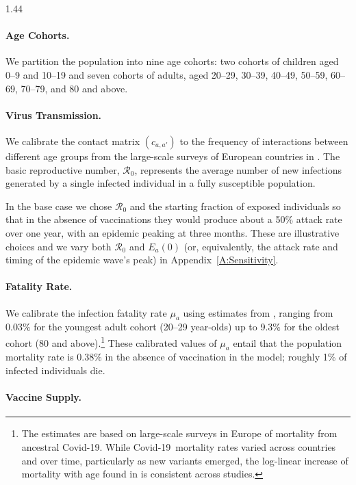 \documentclass[12pt]{article}
\newcommand{\covid}{Covid-19}
\newcommand{\Rzero}{\mathcal{R}_0}
\begin{document}
\begin{spacing}{1.44}
\paragraph{Age Cohorts.}

We partition the population into nine age cohorts: two cohorts of
children aged 0--9 and 10--19 and seven cohorts of adults, aged 20--29, 30--39,
40--49, 50--59, 60--69, 70--79, and 80 and above.

\paragraph{Virus Transmission.}

We calibrate the contact matrix $(c_{a,a'})$ to the frequency of
interactions between different age groups from the large-scale surveys
of European countries in \citet{Mossong2008}.
The basic reproductive number, $\Rzero$, represents the average number
of new infections generated by a single infected individual in a fully
susceptible population.

In the base case we chose $\Rzero$ and the starting fraction of exposed
individuals so that in the absence of vaccinations they would produce
about a 50\% attack rate over one year, with an epidemic peaking at
three months. These are illustrative choices and we vary both
$\Rzero$ and $E_a(0)$ (or, equivalently, the attack rate and timing of
the epidemic wave's peak) in Appendix~\ref{A:Sensitivity}.

\paragraph{Fatality Rate.}

We calibrate the infection fatality rate $\mu_a$ using estimates from
\citet{Verity2020}, ranging from 0.03\% for the youngest adult cohort
(20--29 year-olds) up to 9.3\% for the oldest cohort (80 and
above).\footnote{The \citet{Verity2020} estimates are based on
large-scale surveys in Europe of mortality from ancestral
\covid. While \covid\ mortality rates varied across countries and over
time, particularly as new variants emerged, the log-linear increase of
mortality with age found in \citet{Verity2020} is consistent across
studies.} These calibrated values of $\mu_a$ entail that the
population mortality rate is 0.38\% in the absence of vaccination in
the model; roughly 1\% of infected individuals die.

\paragraph{Vaccine Supply.}


\end{spacing}
\end{document}
